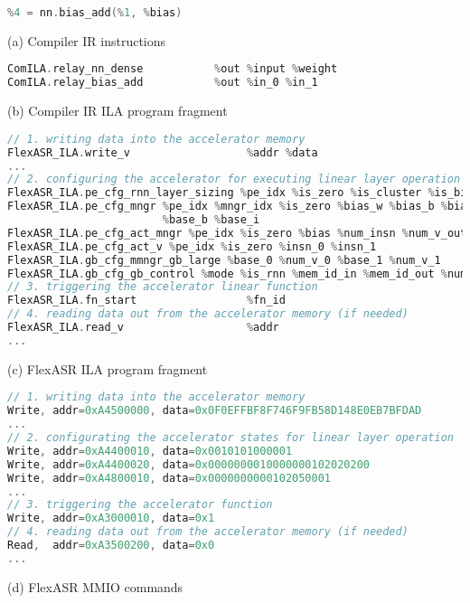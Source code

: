\begin{figure*}[!tb]
\begin{lstlisting}[language=c]
%1 = nn.dense(%input, %weight)
%4 = nn.bias_add(%1, %bias)
\end{lstlisting}
(a) Compiler IR instructions

\begin{lstlisting}[language=c]
ComILA.relay_nn_dense           %out %input %weight
ComILA.relay_bias_add           %out %in_0 %in_1
\end{lstlisting}
(b) Compiler IR ILA program fragment\\

\begin{lstlisting}[language=c]
// 1. writing data into the accelerator memory
FlexASR_ILA.write_v                  %addr %data
...
// 2. configuring the accelerator for executing linear layer operation
FlexASR_ILA.pe_cfg_rnn_layer_sizing %pe_idx %is_zero %is_cluster %is_bias %num_mngr %num_v_out
FlexASR_ILA.pe_cfg_mngr %pe_idx %mngr_idx %is_zero %bias_w %bias_b %bias_i %num_v_in %base_w\
                        %base_b %base_i
FlexASR_ILA.pe_cfg_act_mngr %pe_idx %is_zero %bias %num_insn %num_v_out %buf_base %out_base
FlexASR_ILA.pe_cfg_act_v %pe_idx %is_zero %insn_0 %insn_1
FlexASR_ILA.gb_cfg_mmngr_gb_large %base_0 %num_v_0 %base_1 %num_v_1
FlexASR_ILA.gb_cfg_gb_control %mode %is_rnn %mem_id_in %mem_id_out %num_v_in %num_v_out %num_ts
// 3. triggering the accelerator linear function 
FlexASR_ILA.fn_start                 %fn_id
// 4. reading data out from the accelerator memory (if needed)
FlexASR_ILA.read_v                   %addr
...
\end{lstlisting}
(c) FlexASR ILA program fragment\\

\begin{lstlisting}[language=c]
// 1. writing data into the accelerator memory
Write, addr=0xA4500000, data=0x0F0EFFBF8F746F9FB58D148E0EB7BFDAD
...
// 2. configurating the accelerator states for linear layer operation
Write, addr=0xA4400010, data=0x0010101000001
Write, addr=0xA4400020, data=0x0000000010000000102020200
Write, addr=0xA4800010, data=0x0000000000102050001
...
// 3. triggering the accelerator function
Write, addr=0xA3000010, data=0x1
// 4. reading data out from the accelerator memory (if needed)
Read,  addr=0xA3500200, data=0x0
...
\end{lstlisting}
(d) FlexASR MMIO commands


\end{figure*}
